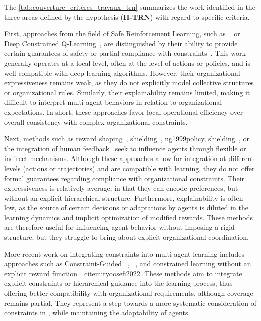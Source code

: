 The \autoref{tab:couverture_critères_travaux_trn} summarizes the work identified in the three areas defined by the hypothesis (\textbf{H-TRN}) with regard to specific criteria.

First, approaches from the field of Safe Reinforcement Learning, such as ~\cite{achiam2017constrained} or Deep Constrained Q-Learning~\cite{kalweit2020deep}, are distinguished by their ability to provide certain guarantees of safety or partial compliance with constraints~\cite {garcia2015comprehensive}. This work generally operates at a local level, often at the level of actions or policies, and is well compatible with deep learning algorithms. However, their organizational expressiveness remains weak, as they do not explicitly model collective structures or organizational rules. Similarly, their explainability remains limited, making it difficult to interpret multi-agent behaviors in relation to organizational expectations. In short, these approaches favor local operational efficiency over overall consistency with complex organizational constraints.

Next, methods such as reward shaping~\cite{ng1999policy}, shielding~\cite{amodei2016concrete}, {ng1999policy}, shielding~\cite{amodei2016concrete}, or the integration of human feedback~\cite{warnell2018deep, zhou2025mentor} seek to influence agents through flexible or indirect mechanisms. Although these approaches allow for integration at different levels (actions or trajectories) and are compatible with learning, they do not offer formal guarantees regarding compliance with organizational constraints. Their expressiveness is relatively average, in that they can encode preferences, but without an explicit hierarchical structure. Furthermore, explainability is often low, as the source of certain decisions or adaptations by agents is diluted in the learning dynamics and implicit optimization of modified rewards. These methods are therefore useful for influencing agent behavior without imposing a rigid structure, but they struggle to bring about explicit organizational coordination.

More recent work on integrating constraints into multi-agent learning includes approaches such as Constraint-Guided ~\cite{spieker2021constraint}, ~\cite{zhou2025mentor}, and constrained learning without an explicit reward function~\ cite{miryoosefi2022}. These methods aim to integrate explicit constraints or hierarchical guidance into the learning process, thus offering better compatibility with organizational requirements, although coverage remains partial. They represent a step towards a more systematic consideration of constraints in , while maintaining the adaptability of agents.

